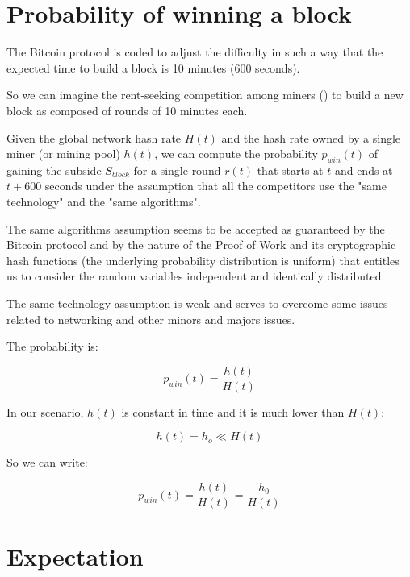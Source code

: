 \documentclass{article}
\begin{document}
\section{Probability of winning a block}

The Bitcoin protocol is coded to adjust the difficulty in such a way that the expected time to build a block is 10 minutes (600 seconds).

So we can imagine the rent-seeking competition among miners (\cite{theEconomicLimits}) to build a new block as composed of rounds of 10 minutes each.

Given the global network hash rate $H(t)$ and the hash rate owned by a single miner (or mining pool) $h(t)$, we can compute the probability $p_{win}(t)$ of gaining the subside $S_{block}$ for a single round $r(t)$ that starts at $t$ and ends at $t+600$ seconds under the assumption that all the competitors use the "same technology" and the "same algorithms".

The same algorithms assumption seems to be accepted as guaranteed by the Bitcoin protocol and by the nature of the Proof of Work and its cryptographic hash functions (the underlying probability distribution is uniform) that entitles us to consider the random variables independent and identically distributed.

The same technology assumption is weak and serves to overcome some issues related to networking and other minors and majors issues.

The probability is:

\begin{equation}
    p_{win}(t) = \frac{h(t)}{H(t)} \label{eq2}
\end{equation}

In our scenario, $h(t)$ is constant in time and it is much lower than $H(t)$: 

\begin{equation}
    h(t) = h_{o} \ll H(t) \label{eq3}
\end{equation}

So we can write:

\begin{equation}
    p_{win}(t) = \frac{h(t)}{H(t)} = \frac{h_{0}}{H(t)} \label{eq4}
\end{equation}

\section{Expectation}
\end{document}

